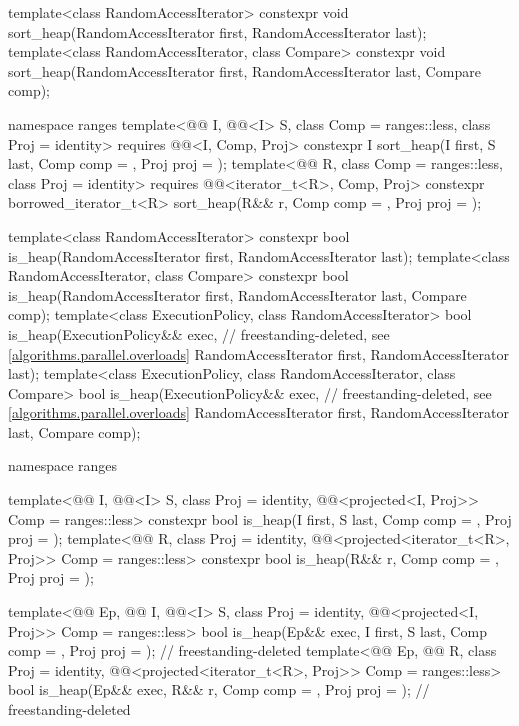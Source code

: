 \begin{codeblock}
{  template<class RandomAccessIterator>
    constexpr void sort_heap(RandomAccessIterator first, RandomAccessIterator last);
  template<class RandomAccessIterator, class Compare>
    constexpr void sort_heap(RandomAccessIterator first, RandomAccessIterator last,
                             Compare comp);

  namespace ranges {
    template<@@ I, @@<I> S, class Comp = ranges::less,
             class Proj = identity>
      requires @@<I, Comp, Proj>
      constexpr I
        sort_heap(I first, S last, Comp comp = {}, Proj proj = {});
    template<@@ R, class Comp = ranges::less, class Proj = identity>
      requires @@<iterator_t<R>, Comp, Proj>
      constexpr borrowed_iterator_t<R>
        sort_heap(R&& r, Comp comp = {}, Proj proj = {});
  }

  template<class RandomAccessIterator>
    constexpr bool is_heap(RandomAccessIterator first, RandomAccessIterator last);
  template<class RandomAccessIterator, class Compare>
    constexpr bool is_heap(RandomAccessIterator first, RandomAccessIterator last,
                           Compare comp);
  template<class ExecutionPolicy, class RandomAccessIterator>
    bool is_heap(ExecutionPolicy&& exec,                        // freestanding-deleted, see \ref{algorithms.parallel.overloads}
                 RandomAccessIterator first, RandomAccessIterator last);
  template<class ExecutionPolicy, class RandomAccessIterator, class Compare>
    bool is_heap(ExecutionPolicy&& exec,                        // freestanding-deleted, see \ref{algorithms.parallel.overloads}
                 RandomAccessIterator first, RandomAccessIterator last,
                 Compare comp);

  namespace ranges {
    template<@@ I, @@<I> S, class Proj = identity,
             @@<projected<I, Proj>> Comp = ranges::less>
      constexpr bool is_heap(I first, S last, Comp comp = {}, Proj proj = {});
    template<@@ R, class Proj = identity,
             @@<projected<iterator_t<R>, Proj>> Comp = ranges::less>
      constexpr bool is_heap(R&& r, Comp comp = {}, Proj proj = {});

    template<@@ Ep, @@ I, @@<I> S,
             class Proj = identity,
             @@<projected<I, Proj>> Comp = ranges::less>
      bool is_heap(Ep&& exec, I first, S last, Comp comp = {},
                   Proj proj = {});                                         // freestanding-deleted
    template<@@ Ep, @@ R, class Proj = identity,
             @@<projected<iterator_t<R>, Proj>> Comp = ranges::less>
      bool is_heap(Ep&& exec, R&& r, Comp comp = {}, Proj proj = {});       // freestanding-deleted
  }

}
\end{codeblock}

